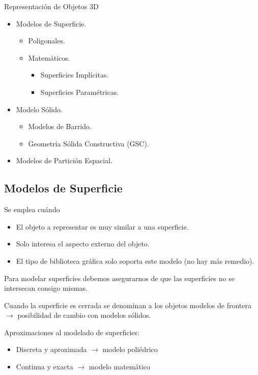 Representación de Objetos 3D
\begin{itemize}
	\item Modelos de Superficie.
	      \begin{itemize}
		      \item Poligonales.
		      \item Matemáticos.
		            \begin{itemize}
			            \item Superficies Implícitas.
			            \item Superficies Paramétricas.
		            \end{itemize}
	      \end{itemize}
	\item Modelo Sólido.
	      \begin{itemize}
		      \item Modelos de Barrido.
		      \item Geometría Sólida Constructiva (GSC).
	      \end{itemize}
	\item Modelos de Partición Espacial.
\end{itemize}

\subsection{Modelos de Superficie}
Se emplea cuándo
\begin{itemize}
	\item El objeto a representar es muy similar a una superficie.
	\item Solo interesa el aspecto externo del objeto.
	\item El tipo de biblioteca gráfica solo soporta este modelo (no hay más remedio).
\end{itemize}

Para modelar superficies debemos asegurarnos de que las superficies no se intersecan consigo mismas.

Cuando la superficie es cerrada se denominan a los objetos modelos de frontera $\rightarrow$ posibilidad de cambio con modelos sólidos.

Aproximaciones al modelado de superficies:
\begin{itemize}
	\item Discreta y aproximada $\rightarrow$ modelo poliédrico
	\item Continua y exacta $\rightarrow$ modelo matemático
\end{itemize}

